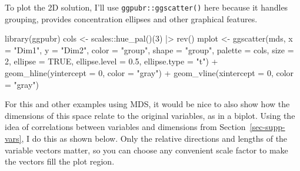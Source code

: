 \documentclass[
  letterpaper,
  10pt,
  krantz2]{krantz}
\makeatletter
\newenvironment{Shaded}{\begin{snugshade}}{\end{snugshade}}
\newcommand{\AttributeTok}[1]{\textcolor[rgb]{0.40,0.45,0.13}{#1}}
\newcommand{\ConstantTok}[1]{\textcolor[rgb]{0.56,0.35,0.01}{#1}}
\newcommand{\DecValTok}[1]{\textcolor[rgb]{0.68,0.00,0.00}{#1}}
\newcommand{\FloatTok}[1]{\textcolor[rgb]{0.68,0.00,0.00}{#1}}
\newcommand{\FunctionTok}[1]{\textcolor[rgb]{0.28,0.35,0.67}{#1}}
\newcommand{\NormalTok}[1]{\textcolor[rgb]{0.00,0.23,0.31}{#1}}
\newcommand{\OtherTok}[1]{\textcolor[rgb]{0.00,0.23,0.31}{#1}}
\newcommand{\SpecialCharTok}[1]{\textcolor[rgb]{0.37,0.37,0.37}{#1}}
\newcommand{\StringTok}[1]{\textcolor[rgb]{0.13,0.47,0.30}{#1}}
\newenvironment{kframe}{%
  \medskip{}
  \setlength{\fboxsep}{.8em}
  \def\at@end@of@kframe{}%
  \ifinner\ifhmode%
  \def\at@end@of@kframe{\end{minipage}}%
  \begin{minipage}{\columnwidth}%
  \fi\fi%
  \def\FrameCommand##1{\hskip\@totalleftmargin \hskip-\fboxsep
  \colorbox{shadecolor}{##1}\hskip-\fboxsep
      \hskip-\linewidth \hskip-\@totalleftmargin \hskip\columnwidth}%
  \MakeFramed {\advance\hsize-\width
    \@totalleftmargin\z@ \linewidth\hsize
    \@setminipage}}%
{\par\unskip\endMakeFramed%
  \at@end@of@kframe}
\renewenvironment{Shaded}{\begin{kframe}}{\end{kframe}}
\makeatother
\begin{document}
To plot the 2D solution, I'll use \texttt{ggpubr::ggscatter()} here
because it handles grouping, provides concentration ellipses and other
graphical features.

\begin{Shaded}
\begin{Highlighting}[]
\FunctionTok{library}\NormalTok{(ggpubr)}
\NormalTok{cols }\OtherTok{\textless{}{-}}\NormalTok{ scales}\SpecialCharTok{::}\FunctionTok{hue\_pal}\NormalTok{()(}\DecValTok{3}\NormalTok{) }\SpecialCharTok{|\textgreater{}} \FunctionTok{rev}\NormalTok{()}
\NormalTok{mplot }\OtherTok{\textless{}{-}}
\FunctionTok{ggscatter}\NormalTok{(mds, }\AttributeTok{x =} \StringTok{"Dim1"}\NormalTok{, }\AttributeTok{y =} \StringTok{"Dim2"}\NormalTok{, }
          \AttributeTok{color =} \StringTok{"group"}\NormalTok{,}
          \AttributeTok{shape =} \StringTok{"group"}\NormalTok{,}
          \AttributeTok{palette =}\NormalTok{ cols,}
          \AttributeTok{size =} \DecValTok{2}\NormalTok{,}
          \AttributeTok{ellipse =} \ConstantTok{TRUE}\NormalTok{,}
          \AttributeTok{ellipse.level =} \FloatTok{0.5}\NormalTok{,}
          \AttributeTok{ellipse.type =} \StringTok{"t"}\NormalTok{) }\SpecialCharTok{+}
  \FunctionTok{geom\_hline}\NormalTok{(}\AttributeTok{yintercept =} \DecValTok{0}\NormalTok{, }\AttributeTok{color =} \StringTok{"gray"}\NormalTok{) }\SpecialCharTok{+}
  \FunctionTok{geom\_vline}\NormalTok{(}\AttributeTok{xintercept =} \DecValTok{0}\NormalTok{, }\AttributeTok{color =} \StringTok{"gray"}\NormalTok{) }
\end{Highlighting}
\end{Shaded}

For this and other examples using MDS, it would be nice to also show how
the dimensions of this space relate to the original variables, as in a
biplot. Using the idea of correlations between variables and dimensions
from Section~\ref{sec-supp-vars}, I do this as shown below. Only the
relative directions and lengths of the variable vectors matter, so you
can choose any convenient scale factor to make the vectors fill the plot
region.
\end{document}
